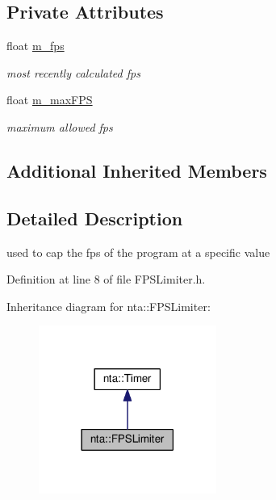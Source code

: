 \subsection*{Private Attributes}
\begin{DoxyCompactItemize}
\item 
\mbox{\label{classnta_1_1FPSLimiter_a06b2818f3bff96da37768829af13df2d}} 
float \hyperlink{classnta_1_1FPSLimiter_a06b2818f3bff96da37768829af13df2d}{m\+\_\+fps}
\begin{DoxyCompactList}\small\item\em most recently calculated fps \end{DoxyCompactList}\item 
\mbox{\label{classnta_1_1FPSLimiter_ae4a323afb44da70acd962cc4c395183d}} 
float \hyperlink{classnta_1_1FPSLimiter_ae4a323afb44da70acd962cc4c395183d}{m\+\_\+max\+F\+PS}
\begin{DoxyCompactList}\small\item\em maximum allowed fps \end{DoxyCompactList}\end{DoxyCompactItemize}
\subsection*{Additional Inherited Members}


\subsection{Detailed Description}
used to cap the fps of the program at a specific value 

Definition at line 8 of file F\+P\+S\+Limiter.\+h.



Inheritance diagram for nta\+:\+:F\+P\+S\+Limiter\+:
\nopagebreak
\begin{figure}[H]
\begin{center}
\leavevmode
\includegraphics[width=165pt]{de/d03/classnta_1_1FPSLimiter__inherit__graph}
\end{center}
\end{figure}


